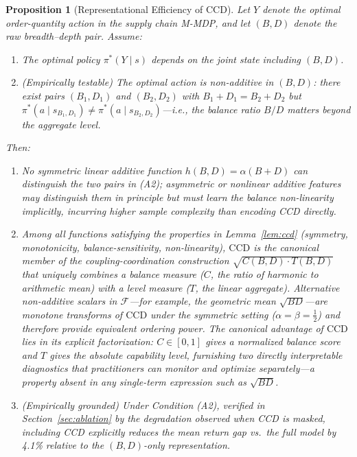 \documentclass[11pt,a4paper]{article}
\theoremstyle{plain}
\newtheorem{proposition}{Proposition}
\theoremstyle{definition}
\newcommand{\CCD}{\mathrm{CCD}}
\begin{document}
\begin{proposition}[Representational Efficiency of CCD]
\label{prop:info}
Let $Y$ denote the optimal order-quantity action in the supply chain M-MDP, and let
$(B,D)$ denote the raw breadth--depth pair.  Assume:
\begin{enumerate}[label=(A\arabic*),itemsep=2pt]
  \item The optimal policy $\pi^*(Y\mid s)$ depends on the joint state including $(B,D)$.
  \item \emph{(Empirically testable)} The optimal action is non-additive in $(B,D)$:
    there exist pairs $(B_1,D_1)$ and $(B_2,D_2)$ with $B_1+D_1=B_2+D_2$ but
    $\pi^*(a\mid s_{B_1,D_1})\ne\pi^*(a\mid s_{B_2,D_2})$---i.e., the
    balance ratio $B/D$ matters beyond the aggregate level.
\end{enumerate}
Then:
\begin{enumerate}[label=(\roman*),itemsep=2pt]
  \item No \emph{symmetric linear} additive function $h(B,D)=\alpha(B+D)$ can distinguish
    the two pairs in (A2); asymmetric or nonlinear additive features may distinguish them
    in principle but must learn the balance non-linearity implicitly, incurring higher
    sample complexity than encoding CCD directly.
  \item Among all functions satisfying the properties in Lemma~\ref{lem:ccd} (symmetry,
    monotonicity, balance-sensitivity, non-linearity), $\CCD$ is the \emph{canonical
    member} of the coupling-coordination construction $\sqrt{C(B,D)\cdot T(B,D)}$ that
    uniquely combines a \emph{balance measure} ($C$, the ratio of harmonic to arithmetic
    mean) with a \emph{level measure} ($T$, the linear aggregate).  Alternative
    non-additive scalars in $\mathcal{F}$---for example, the geometric mean
    $\sqrt{BD}$---are monotone transforms of $\CCD$ under the symmetric setting
    ($\alpha=\beta=\tfrac{1}{2}$) and therefore provide equivalent ordering power.
    The canonical advantage of $\CCD$ lies in its \emph{explicit factorization}:
    $C\in[0,1]$ gives a normalized balance score and $T$ gives the absolute capability
    level, furnishing two directly interpretable diagnostics that practitioners can
    monitor and optimize separately---a property absent in any single-term expression
    such as $\sqrt{BD}$.
  \item \emph{(Empirically grounded)} Under Condition (A2), verified in
    Section~\ref{sec:ablation} by the degradation observed when CCD is masked, including
    CCD explicitly reduces the mean return gap vs.\ the full model by 4.1\% relative to
    the $(B,D)$-only representation.
\end{enumerate}
\end{proposition}
\end{document}
